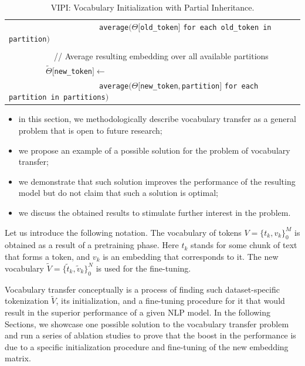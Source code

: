 \documentclass[review]{elsarticle}
\begin{document}
\begin{table}[h!]
{\begin{tabular}{l}
~~~~~~~~~~~~~~~~~~~~~~\verb"average"$( \Theta[$\verb"old_token"$]$ \verb"for each old_token in partition"$)$\\
\\ 
~~~~~~~~~~~// Average resulting embedding over all available partitions\\
~~~~~~~~~$\widetilde{\Theta}$[\verb"new_token"$]\leftarrow$ \\
~~~~~~~~~~~~~~~~~~~~~~\verb"average"$( \Theta[$\verb"new_token"$, $\verb"partition"$]$ \verb"for each partition in partitions"$)$\\
 \hline
\end{tabular}}
\caption{VIPI: Vocabulary Initialization with Partial Inheritance.}
  \label{fig:vipi}
\end{table}



\begin{itemize}
    \item in this section, we methodologically describe vocabulary transfer as a general problem that is open to future research;
    \item we propose an example of a possible solution for the problem of vocabulary transfer;
    \item we demonstrate that such solution improves the performance of the resulting model but do not claim that such a solution is optimal;
    \item we discuss the obtained results to stimulate further interest in the problem.
\end{itemize}

Let us introduce the following notation. The vocabulary of tokens $V = \{t_k, v_k\}^{M}_{0}$  is obtained as a result of a pretraining phase. Here $t_k$ stands for some chunk of text that forms a token, and $v_k$ is an embedding that corresponds to it. The new vocabulary $\widetilde{V} =  \{\widetilde{t}_k, \widetilde{v}_k\}^{N}_{0}$ is used for the fine-tuning. 

Vocabulary transfer conceptually is a process of finding such dataset-specific tokenization  $\widetilde{V}$, its initialization, and a fine-tuning procedure for it that would result in the superior performance of a given NLP model. In the following Sections, we showcase one possible solution to the vocabulary transfer problem and run a series of ablation studies to prove that the boost in the performance is due to a specific initialization procedure and fine-tuning of the new embedding matrix.
\end{document}
